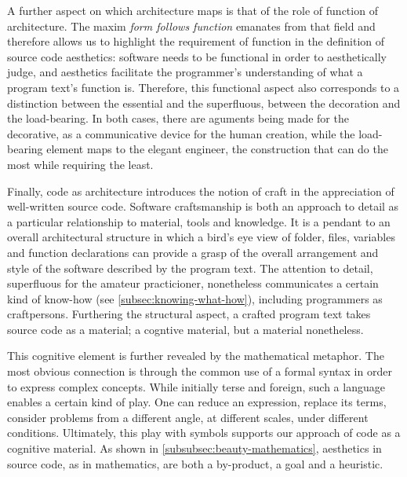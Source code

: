 A further aspect on which architecture maps is that of the role of function of architecture. The maxim \emph{form follows function} emanates from that field and therefore allows us to highlight the requirement of function in the definition of source code aesthetics: software needs to be functional in order to aesthetically judge, and aesthetics facilitate the programmer's understanding of what a program text's function is. Therefore, this functional aspect also corresponds to a distinction between the essential and the superfluous, between the decoration and the load-bearing. In both cases, there are aguments being made for the decorative, as a communicative device for the human creation, while the load-bearing element maps to the elegant engineer, the construction that can do the most while requiring the least.

Finally, code as architecture introduces the notion of craft in the appreciation of well-written source code. Software craftsmanship is both an approach to detail as a particular relationship to material, tools and knowledge. It is a pendant to an overall architectural structure in which a bird's eye view of folder, files, variables and function declarations can provide a grasp of the overall arrangement and style of the software described by the program text. The attention to detail, superfluous for the amateur practicioner, nonetheless communicates a certain kind of know-how (see \ref{subsec:knowing-what-how}), including programmers as craftpersons. Furthering the structural aspect, a crafted program text takes source code as a material; a cogntive material, but a material nonetheless.

This cognitive element is further revealed by the mathematical metaphor. The most obvious connection is through the common use of a formal syntax in order to express complex concepts. While initially terse and foreign, such a language enables a certain kind of play. One can reduce an expression, replace its terms, consider problems from a different angle, at different scales, under different conditions. Ultimately, this play with symbols supports our approach of code as a cognitive material. As shown in \ref{subsubsec:beauty-mathematics}, aesthetics in source code, as in mathematics, are both a by-product, a goal and a heuristic.

